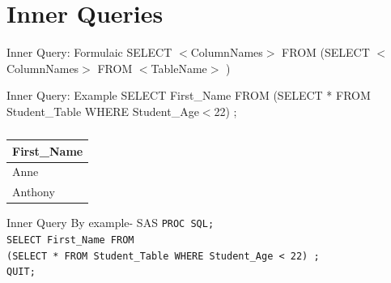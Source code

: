 \documentclass{beamer}
\begin{document}
	\section{Inner Queries}
	\begin{frame}
		\begin{block}{Inner Query: Formulaic}
			SELECT $<$ColumnNames$>$ FROM (SELECT $<$ColumnNames$>$ FROM $<$TableName$>$ )
		\end{block}
		\begin{block}{Inner Query: Example}
			SELECT First\_Name FROM (SELECT * FROM Student\_Table WHERE Student\_Age$<$22) ;
		\end{block}		
	\begin{table}[H]
	\centering
	\caption*{}

	\begin{tabular}{|l|}
		\hline
		First\_Name  \\ \hline
		Anne  \\ \hline
		Anthony  \\    \hline
	\end{tabular}
	\end{table}				
	\end{frame}
	
	\begin{frame}{Inner Query By example- SAS}
		\texttt{PROC SQL;} \\
		\texttt{SELECT First\_Name FROM } \\
		\texttt{(SELECT * FROM Student\_Table WHERE Student\_Age < 22) ;}\\
		\texttt{QUIT;}
	\end{frame}	
	
	
	
\end{document}
